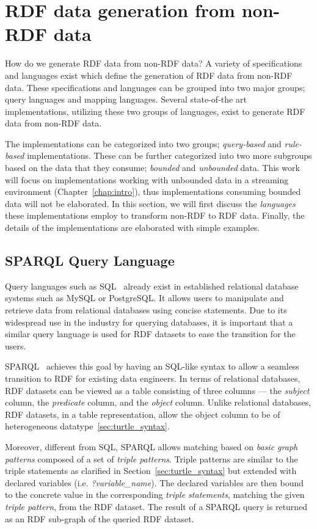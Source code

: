 \chapter{RDF data generation from non-RDF data}
\label{chap:rdf_data_generation}

How do we generate RDF data from non-RDF data? A variety of specifications and languages exist
which define the generation of RDF data from non-RDF data. These specifications and languages can be grouped 
into two major groups; query languages and mapping languages. Several state-of-the art implementations, 
utilizing these two groups of languages, exist to generate RDF data from non-RDF data.

The implementations can be categorized into two groups; \emph{query-based} and 
\emph{rule-based} implementations. These can be further categorized into two more subgroups 
based on the data that they consume; \emph{bounded} and \emph{unbounded} data. 
This work will focus on 
implementations working with unbounded data in a streaming environment (Chapter~\ref{chap:intro}), 
thus implementations 
consuming bounded data will not be elaborated. 
In this section, we will first discuss the \emph{languages} these implementations employ 
to transform non-RDF to RDF data. Finally, the details of the implementations are elaborated 
with simple examples. 


\section{SPARQL Query Language}
Query languages such as SQL~\cite{sql} already exist in established relational database systems such as 
MySQL or PostgreSQL. It allows users to manipulate and retrieve data 
from relational databases using concise statements. Due to its widespread 
use in the industry for querying databases, it is important that a similar 
query language is used for RDF datasets to ease the transition for the users. 

SPARQL~\cite{sparql} achieves this goal by having an SQL-like syntax to allow 
a seamless transition to RDF for existing data engineers. 
In terms of relational databases, RDF 
datasets can be viewed as a table consisting of three columns --- the \textit{subject} column, 
the \textit{predicate} column, and the \textit{object} column. Unlike relational databases, 
RDF datasets, in a table representation, allow the object column to be of heterogeneous 
datatype~\ref{sec:turtle_syntax}. 


Moreover, different from SQL, SPARQL allows matching based on \emph{basic graph patterns} composed 
of a set of \emph{triple patterns}. Triple patterns are similar to the triple statements 
as clarified in Section~\ref{sec:turtle_syntax} but extended with declared variables (i.e. \emph{?variable\_name}). 
The declared variables are then bound to the concrete value in the corresponding \emph{triple statements},
matching the given \emph{triple pattern}, from the RDF dataset. 
The result of a SPARQL query is returned as an RDF sub-graph of the queried RDF dataset. 

